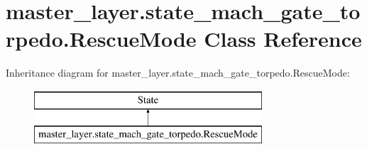 \hypertarget{classmaster__layer_1_1state__mach__gate__torpedo_1_1RescueMode}{}\section{master\+\_\+layer.\+state\+\_\+mach\+\_\+gate\+\_\+torpedo.\+Rescue\+Mode Class Reference}
\label{classmaster__layer_1_1state__mach__gate__torpedo_1_1RescueMode}
Inheritance diagram for master\+\_\+layer.\+state\+\_\+mach\+\_\+gate\+\_\+torpedo.\+Rescue\+Mode\+:\begin{figure}[H]
\begin{center}
\leavevmode
\includegraphics[height=2.000000cm]{classmaster__layer_1_1state__mach__gate__torpedo_1_1RescueMode}
\end{center}
\end{figure}
